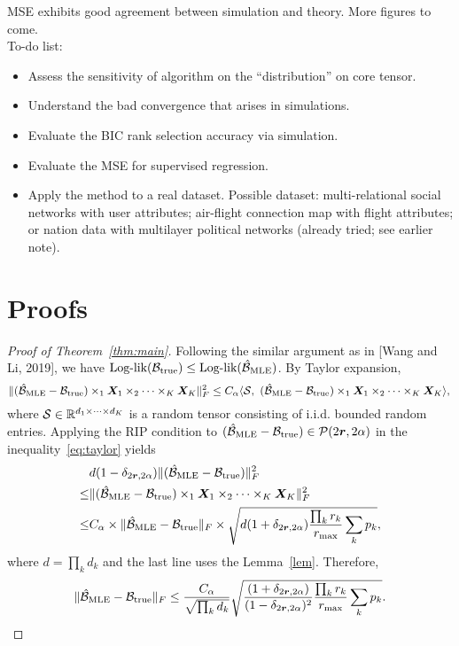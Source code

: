 \documentclass[11pt]{article}
\theoremstyle{plain}
\theoremstyle{definition}
\begin{document}
MSE exhibits good agreement between simulation and theory. More figures to come.\\
To-do list:
\begin{itemize}
\item Assess the sensitivity of algorithm on the ``distribution'' on core tensor. 
\item Understand the bad convergence that arises in simulations.  
\item Evaluate the BIC rank selection accuracy via simulation.
\item Evaluate the MSE for supervised regression.
\item Apply the method to a real dataset. Possible dataset: multi-relational social networks with user attributes; air-flight connection map with flight attributes; or nation data with multilayer political networks (already tried; see earlier note). 
\end{itemize}
\section{Proofs}

\begin{proof}[Proof of Theorem~\ref{thm:main}]
Following the similar argument as in [Wang and Li, 2019], we have $\text{Log-lik}(\mathcal{B}_\text{true})\leq \text{Log-lik}(\hat {\mathcal{B}}_{\text{MLE}})$. By Taylor expansion, 
\begin{equation}\label{eq:taylor}
\lVert(\hat {\mathcal{B}}_{\text{MLE}}-\mathcal{B}_{\text{true}})\times_1 \bm X_1\times_2 \cdots\times_K \bm X_K\rVert_F^2 \leq C_\alpha\langle \mathcal{S},\ (\hat {\mathcal{B}}_{\text{MLE}}-\mathcal{B}_{\text{true}})\times_1 \bm X_1\times_2 \cdots\times_K \bm X_K \rangle ,\\
\end{equation}
where $\mathcal{S}\in\mathbb{R}^{d_1\times \cdots \times d_K}$ is a random tensor consisting of i.i.d. bounded random entries. Applying the RIP condition to $(\hat {\mathcal{B}}_{\text{MLE}}-\mathcal{B}_{\text{true}})\in\mathcal{P}(2\bm{r},2\alpha)$ in the inequality~\eqref{eq:taylor} yields
\begin{align}
&d (1-\delta_{2\bm{r},2\alpha})\lVert(\hat {\mathcal{B}}_{\text{MLE}}-\mathcal{B}_{\text{true}})\rVert_F^2\\
\leq &\lVert(\hat {\mathcal{B}}_{\text{MLE}}-\mathcal{B}_{\text{true}})\times_1 \bm X_1\times_2 \cdots\times_K \bm X_K\rVert_F^2\\
\leq & C_\alpha\times \lVert\hat {\mathcal{B}}_{\text{MLE}}-\mathcal{B}_{\text{true}}\rVert_F\times \sqrt{ d(1+\delta_{2\bm{r},2\alpha}) {\prod_k r_k\over r_{\max}}\sum_k p_k},
\end{align}
where $d=\prod_k d_k$ and the last line uses the Lemma~\ref{lem}. Therefore,
\[
\lVert\hat {\mathcal{B}}_{\text{MLE}}-\mathcal{B}_{\text{true}}\rVert_F\leq {C_\alpha \over \sqrt{\prod_k d_k} } \sqrt{ {(1+\delta_{2\bm{r},2\alpha})\over (1-\delta_{2\bm{r},2\alpha})^2}  {\prod_k r_k \over r_{\max}} \sum_k p_k}.
\]
\end{proof}
\end{document}
